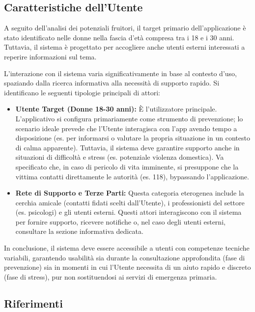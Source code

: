 \documentclass[a4paper,12pt]{article}
\newcommand{\ignoreglossary}{}
\begin{document}
\subsection{Caratteristiche dell'\ignoreglossary{Utente}} \label{sec:caratteristiche utente}
A seguito dell'analisi dei potenziali fruitori, il target primario dell'applicazione è stato identificato nelle donne nella fascia d'età compresa tra i 18 e i 30 anni. Tuttavia, il sistema è progettato per accogliere anche utenti esterni interessati a reperire informazioni sul tema.

L'interazione con il sistema varia significativamente in base al contesto d'uso, spaziando dalla ricerca informativa alla necessità di supporto rapido. Si identificano le seguenti tipologie principali di attori:

\begin{itemize}
    \item \textbf{Utente Target (Donne 18-30 anni):} È l'utilizzatore principale. L'applicativo si configura primariamente come strumento di prevenzione; lo scenario ideale prevede che l'Utente interagisca con l'app avendo tempo a disposizione (es. per informarsi o valutare la propria situazione in un contesto di calma apparente).
    Tuttavia, il sistema deve garantire supporto anche in situazioni di difficoltà e stress (es. potenziale violenza domestica). Va specificato che, in caso di pericolo di vita imminente, si presuppone che la vittima contatti direttamente le autorità (es. 118), bypassando l'applicazione.
    
    \item \textbf{Rete di Supporto e Terze Parti:} Questa categoria eterogenea include la cerchia amicale (contatti fidati scelti dall'Utente), i professionisti del settore (es. psicologi) e gli utenti esterni. Questi attori interagiscono con il sistema per fornire supporto, ricevere notifiche o, nel caso degli utenti esterni, consultare la sezione informativa dedicata.
\end{itemize}

In conclusione, il sistema deve essere accessibile a utenti con competenze tecniche variabili, garantendo usabilità sia durante la consultazione approfondita (fase di prevenzione) sia in momenti in cui l'Utente necessita di un aiuto rapido e discreto (fase di stress), pur non sostituendosi ai servizi di emergenza primaria.


\subsection{Riferimenti} \label{sec:riferimenti}
\end{document}
